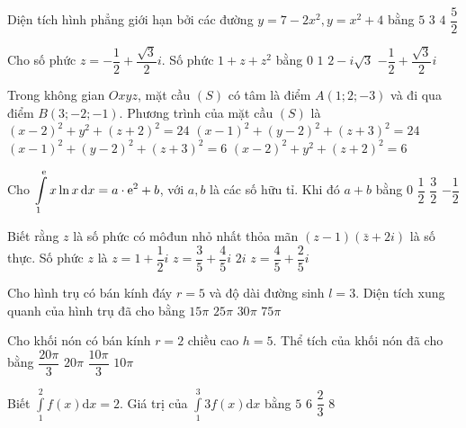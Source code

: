 \begin{ex}%
Diện tích hình phẳng giới hạn bởi các đường $y=7-2 x^2, y=x^2+4$ bằng
\choice
{$5$}
{$3$}
{\True $4$}
{$\dfrac{5}{2}$}

\end{ex}
\begin{ex}%
Cho số phức $z=-\dfrac{1}{2}+\dfrac{\sqrt{3}}{2} i$. Số phức $1+z+z^2$ bằng
\choice
{\True $0$}
{$1$}
{$2-i \sqrt{3}$}
{$-\dfrac{1}{2}+\dfrac{\sqrt{3}}{2} i$}

\end{ex}
\begin{ex}%
Trong không gian $O x y z$, mặt cầu $(S)$ có tâm là điểm $A(1; 2;-3)$ và đi qua điểm $B(3;-2;-1)$. Phương trình của mặt cầu $(S)$ là
\choice
{$(x-2)^2+y^2+(z+2)^2=24$}
{\True $(x-1)^2+(y-2)^2+(z+3)^2=24$}
{$(x-1)^2+(y-2)^2+(z+3)^2=6$}
{$(x-2)^2+y^2+(z+2)^2=6$}

\end{ex}
\begin{ex}%
Cho $\displaystyle\int\limits_1^{{\rm e}} x \ln x \mathrm{\,d} x=a \cdot {\rm e}^2+b$, với $a, b$ là các số hữu tỉ. Khi đó $a+b$ bằng
\choice
{$0$}
{\True $\dfrac{1}{2}$}
{$\dfrac{3}{2}$}
{$-\dfrac{1}{2}$}

\end{ex}
\begin{ex}%
Biết rằng $z$ là số phức có môđun nhỏ nhất thỏa mãn $(z-1)(\bar{z}+2 i)$ là số thực. Số phức $z$ là
\choice
{$z=1+\dfrac{1}{2} i$}
{$z=\dfrac{3}{5}+\dfrac{4}{5} i$}
{$2 i$}
{\True $z=\dfrac{4}{5}+\dfrac{2}{5} i$}

\end{ex}
\begin{ex}%
Cho hình trụ có bán kính đáy $r=5$ và độ dài đường sinh $l=3$. Diện tích xung quanh của hình trụ đã cho bằng
\choice
{$15\pi$}
{$25\pi$}
{\True $30\pi$}
{$75\pi$}

\end{ex}
\begin{ex}%
Cho khối nón có bán kính $r=2$ chiều cao $h=5$. Thể tích của khối nón đã cho bằng
\choice
{\True $\dfrac{20\pi}{3}$}
{$20\pi$}
{$\dfrac{10\pi}{3}$}
{$10\pi$}

\end{ex}
\begin{ex}%
Biết $\displaystyle\int\limits_1^2 f(x) \mathrm{d} x=2$. Giá trị của $\displaystyle\int\limits_1^3 3 f(x) \mathrm{d} x$ bằng
\choice
{$5$}
{\True $6$}
{$\dfrac{2}{3}$}
{$8$}

\end{ex}
